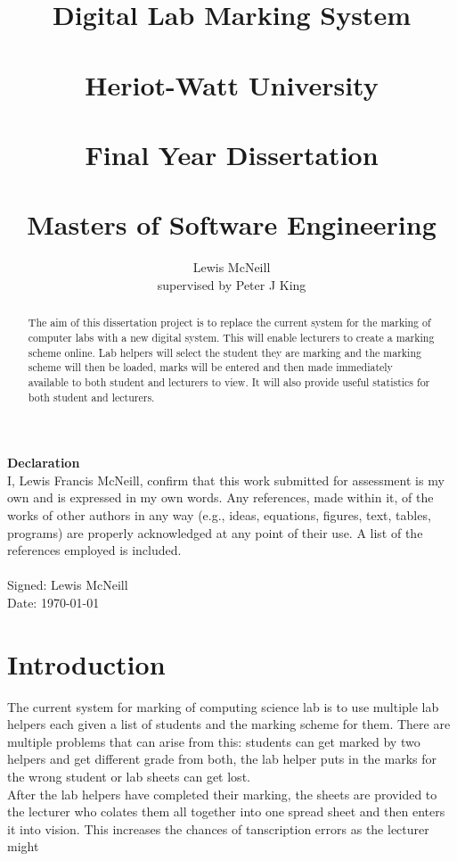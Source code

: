 \documentclass[12pt]{article}  %
\title{Digital Lab Marking System \\~\\  \large{Heriot-Watt University} \\~\\ Final Year Dissertation \\~\\ Masters of Software Engineering}
\author{Lewis McNeill\\
supervised by
Peter J King}
\begin{document}
\maketitle
{}
\newpage

\doublespacing
\textbf{\Large{Declaration}} \\[2em]
I, Lewis Francis McNeill, confirm that this work submitted for assessment is my own and is expressed in my own words. Any references, made within it, of the works of other authors in any way (e.g., ideas, equations, figures, text, tables, programs) are properly acknowledged at any point of their use. A list of the references employed is included.
\\
\\
Signed: Lewis McNeill
\\
Date: \today



\newpage                 
\begin{abstract}

\noindent
The aim of this dissertation project is to replace the current system for the marking of computer labs with a new digital system. This will enable lecturers to create a marking scheme online. Lab helpers will select the student they are marking and the marking scheme will then be loaded, marks will be entered and then made immediately available to both student and lecturers to view. It will also provide useful statistics for both student and lecturers.

\end{abstract}

\newpage                  
\tableofcontents


\newpage     

\setcounter{page}{1}

\section{Introduction}

The current system for marking of computing science lab is to use multiple lab helpers each given a list of students and the marking scheme for them. There are multiple problems that can arise from this: students can get marked by two helpers and get different grade from both, the lab helper puts in the marks for the wrong student or lab sheets can get lost. \\
After the lab helpers have completed their marking, the sheets are provided to the lecturer who colates them all together into one spread sheet and then enters it into vision. This increases the chances of tanscription errors as the lecturer might 
\end{document}
